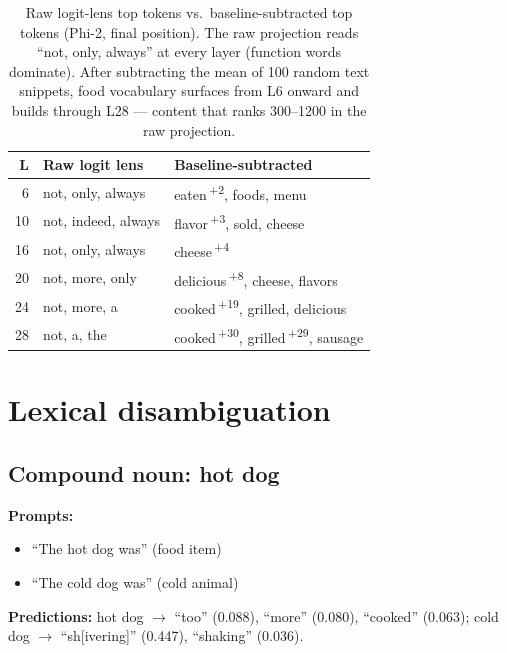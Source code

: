 \documentclass[11pt]{article}
\begin{document}
\begin{table}[htbp]
\centering
\small
\begin{tabular}{@{}r@{\;\;}l@{\;\;}l@{}}
\toprule
\textbf{L} & \textbf{Raw logit lens} & \textbf{Baseline-subtracted} \\
\midrule
6  & not, only, always            & eaten\,\textsuperscript{+2}, foods, menu \\
10 & not, indeed, always          & flavor\,\textsuperscript{+3}, sold, cheese \\
16 & not, only, always            & cheese\,\textsuperscript{+4} \\
20 & not, more, only              & delicious\,\textsuperscript{+8}, cheese, flavors \\
24 & not, more, a                 & cooked\,\textsuperscript{+19}, grilled, delicious \\
28 & not, a, the                  & cooked\,\textsuperscript{+30}, grilled\,\textsuperscript{+29}, sausage \\
\bottomrule
\end{tabular}
\caption{Raw logit-lens top tokens vs.\ baseline-subtracted top tokens
(Phi-2, final position). The raw projection reads ``not, only, always''
at every layer (function words dominate). After subtracting the mean of
100 random text snippets, food vocabulary surfaces from L6 onward and
builds through L28 --- content that ranks 300--1200 in the raw projection.}
\label{tab:decomposition}
\end{table}

\section{Lexical disambiguation}

\subsection{Compound noun: hot dog}

\textbf{Prompts:}
\begin{itemize}[leftmargin=*]
\item ``The hot dog was'' (food item)
\item ``The cold dog was'' (cold animal)
\end{itemize}

\textbf{Predictions:} hot dog $\rightarrow$ ``too'' (0.088), ``more'' (0.080), ``cooked'' (0.063);
cold dog $\rightarrow$ ``sh[ivering]'' (0.447), ``shaking'' (0.036).
\end{document}
